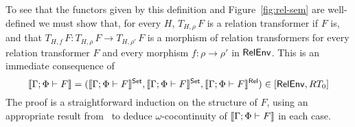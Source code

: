 \documentclass[runningheads]{llncs}
\begin{document}
To see that the functors given by 
this definition and Figure~\ref{fig:rel-sem} are well-defined we must
show that, for every $H$, $T_{H,\rho}\,F$ is a relation transformer if
$F$ is, and that $T_{H,f}\, F : T_{H,\rho}\, F \to T_{H,\rho'}\, F$ is
a morphism of relation transformers for every relation transformer $F$
and every morphism $f : \rho \to \rho'$ in $\mathsf{RelEnv}$. This is an
immediate consequence of
\begin{equation}\label{lem:rel-transf-morph}
\llbracket{\Gamma;\Phi \vdash F}\rrbracket =
(\llbracket{\Gamma;\Phi \vdash F}\rrbracket^{\mathsf{Set}}, \llbracket{\Gamma;\Phi \vdash
  F}\rrbracket^{\mathsf{Set}},\llbracket{\Gamma;\Phi \vdash F}\rrbracket^{\mathsf{Rel}}) \in
[\mathsf{RelEnv},RT_0]
\end{equation}
\noindent
The proof is a straightforward induction on the structure of $F$,
using an appropriate result from~\cite{jp19} to deduce
$\omega$-cocontinuity of $\llbracket{\Gamma;\Phi \vdash F}\rrbracket$ in each case.
\end{document}
